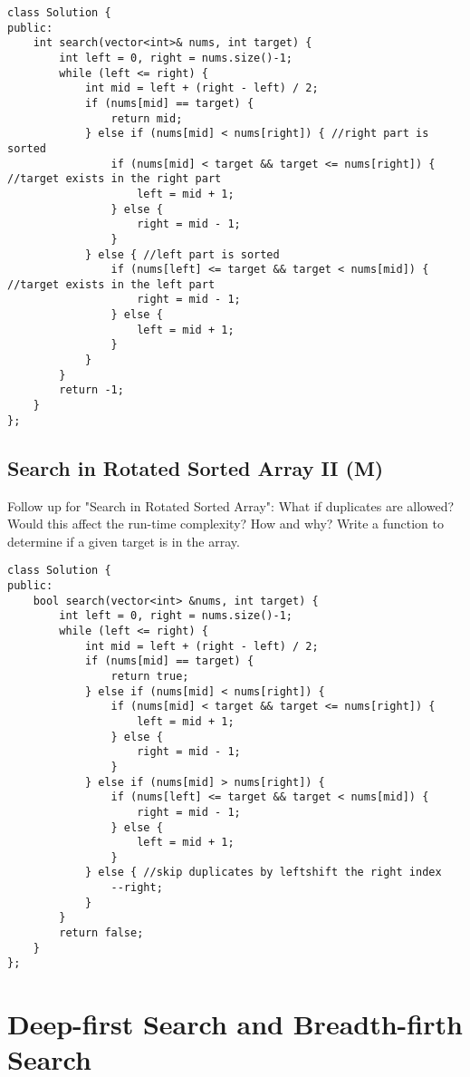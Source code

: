 \begin{lstlisting}
class Solution {
public:
    int search(vector<int>& nums, int target) {
        int left = 0, right = nums.size()-1;
        while (left <= right) {
            int mid = left + (right - left) / 2;
            if (nums[mid] == target) {
                return mid;
            } else if (nums[mid] < nums[right]) { //right part is sorted
                if (nums[mid] < target && target <= nums[right]) { //target exists in the right part
                    left = mid + 1;
                } else {
                    right = mid - 1;
                }            
            } else { //left part is sorted
                if (nums[left] <= target && target < nums[mid]) { //target exists in the left part
                    right = mid - 1;
                } else {
                    left = mid + 1;
                }
            }
        }
        return -1;
    }
};
\end{lstlisting}


\subsection{Search in Rotated Sorted Array II (M)}
Follow up for "Search in Rotated Sorted Array":
What if duplicates are allowed?
Would this affect the run-time complexity? How and why?
Write a function to determine if a given target is in the array.\\

\begin{lstlisting}
class Solution {
public:
    bool search(vector<int> &nums, int target) {
        int left = 0, right = nums.size()-1;
        while (left <= right) {
            int mid = left + (right - left) / 2;
            if (nums[mid] == target) {
                return true;
            } else if (nums[mid] < nums[right]) {
                if (nums[mid] < target && target <= nums[right]) {
                    left = mid + 1;
                } else {
                    right = mid - 1;
                }
            } else if (nums[mid] > nums[right]) {
                if (nums[left] <= target && target < nums[mid]) {
                    right = mid - 1;
                } else {
                    left = mid + 1;
                }
            } else { //skip duplicates by leftshift the right index
                --right;
            }
        }
        return false;
    }
};
\end{lstlisting}


\section{Deep-first Search and Breadth-firth Search}
